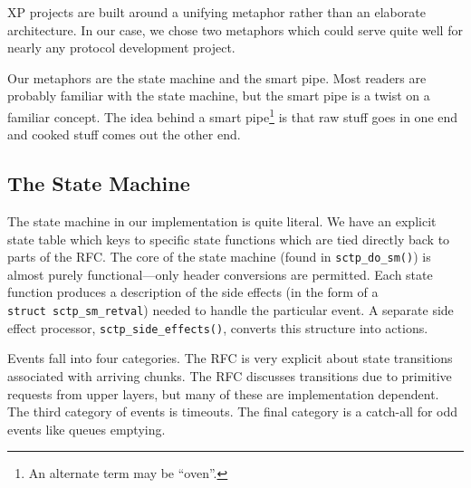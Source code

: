 \documentclass[twocolumn]{article}
\begin{document}
XP projects are built around a unifying metaphor rather than an
elaborate architecture.  In our case, we chose two metaphors which
could serve quite well for nearly any protocol development project.

Our metaphors are the state machine and the smart pipe.  Most readers
are probably familiar with the state machine, but the smart pipe is a
twist on a familiar concept.  The idea behind a smart pipe\footnote{An
alternate term may be ``oven''.} is that raw stuff goes in one end and
cooked stuff comes out the other end.

\subsection{The State Machine}

The state machine in our implementation is quite literal.  We have an
explicit state table which keys to specific state functions which are
tied directly back to parts of the RFC.  The core of the state machine
(found in \texttt{sctp\_do\_sm()}) is almost purely functional---only header
conversions are permitted.  Each state function produces a description
of the side effects (in the form of a \texttt{struct~sctp\_sm\_retval})
needed to handle the particular event.  A separate side effect
processor, \texttt{sctp\_side\_effects()}, converts this structure into
actions.

Events fall into four categories.  The RFC is very explicit about
state transitions associated with arriving chunks.  The RFC discusses
transitions due to primitive requests from upper layers, but many of
these are implementation dependent.  The third category of events is
timeouts.  The final category is a catch-all for odd events like
queues emptying.
\end{document}
